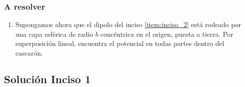 \documentclass[12pt]{beamer}
\begin{document}
\begin{frame}
\frametitle{A resolver}
\begin{enumerate}[<+->]    
\conti
\item \label{item:inciso_3} Supongamos ahora que el dipolo del inciso \ref{item:inciso_2} está rodeado por una capa esférica de radio $b$ concéntrica en el origen, puesta a tierra. Por superposición lineal, encuentra el potencial en todas partes dentro del cascarón.
\end{enumerate}
\end{frame}

\subsection{Solución Inciso 1}
\end{document}
